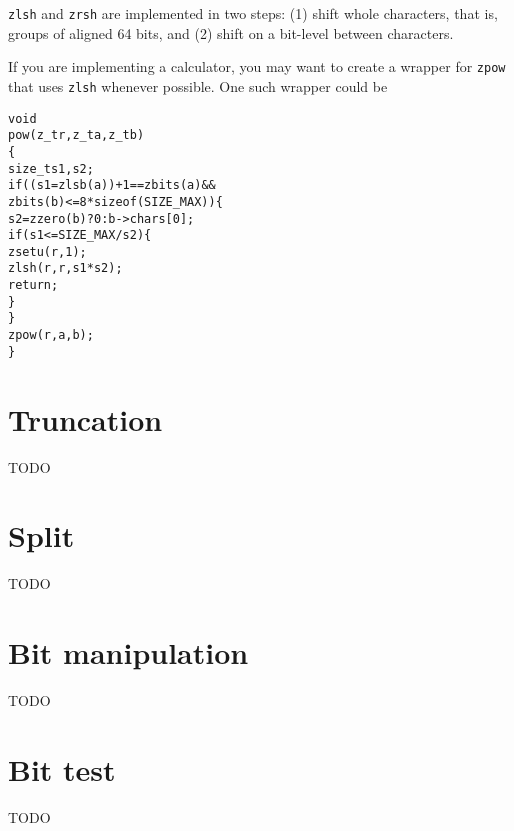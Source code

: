 {\tt zlsh} and {\tt zrsh} are implemented in two steps:
(1) shift whole characters, that is, groups of aligned
64 bits, and (2) shift on a bit-level between characters.

If you are implementing a calculator, you may want to
create a wrapper for {\tt zpow} that uses {\tt zlsh}
whenever possible. One such wrapper could be

\begin{alltt}
   void
   pow(z_t r, z_t a, z_t b)
   \{
       size_t s1, s2;
       if ((s1 = zlsb(a)) + 1 == zbits(a) &&
                     zbits(b) <= 8 * sizeof(SIZE_MAX)) \{
           s2 = zzero(b) ? 0 : b->chars[0];
           if (s1 <= SIZE_MAX / s2) \{
               zsetu(r, 1);
               zlsh(r, r, s1 * s2);
               return;
           \}
       \}
       zpow(r, a, b);
   \}
\end{alltt}


\newpage
\section{Truncation}
\label{sec:Truncation}

TODO %


\newpage
\section{Split}
\label{sec:Split}

TODO %


\newpage
\section{Bit manipulation}
\label{sec:Bit manipulation}

TODO %


\newpage
\section{Bit test}
\label{sec:Bit test}

TODO %
